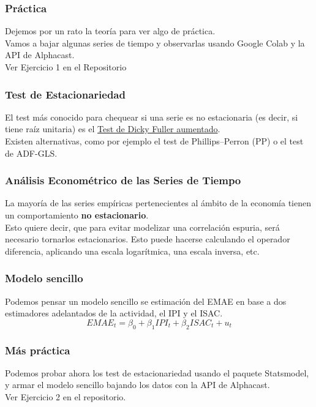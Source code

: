 \documentclass{beamer}
\begin{document}
\begin{frame}
\frametitle{Práctica}
\justify
Dejemos por un rato la teoría para ver algo de práctica. \\
\vspace{5mm} %
Vamos a bajar algunas series de tiempo y observarlas usando Google Colab y la API de Alphacast. \\
\vspace{5mm} %
Ver Ejercicio 1 en el Repositorio
\end{frame}


\begin{frame}
\frametitle{Test de Estacionariedad}
\justify
El test más conocido para chequear si una serie es no estacionaria (es decir, si tiene raíz unitaria) es el \href{https://en.wikipedia.org/wiki/Augmented_Dickey-Fuller_test}{Test de Dicky Fuller aumentado}.\\

\vspace{5mm} %
Existen alternativas, como por ejemplo el test de Phillips–Perron (PP) o el test de ADF-GLS. 
\end{frame}


\begin{frame}
\frametitle{Análisis Econométrico de las Series de Tiempo}
\justify
La mayoría de las series empíricas pertenecientes al ámbito de la economía tienen un comportamiento \textbf{no estacionario}.\\
\vspace{5mm} %
Esto quiere decir, que para evitar modelizar una correlación espuria, será necesario tornarlos estacionarios. Esto puede hacerse calculando el operador diferencia, aplicando una escala logarítmica, una escala inversa, etc. 
\end{frame}


\begin{frame}
\frametitle{Modelo sencillo}
\justify
Podemos pensar un modelo sencillo se estimación del EMAE en base a dos estimadores adelantados de la actividad, el IPI y el ISAC.\\
\vspace{5mm} %
\[
EMAE_t=\beta_0+\beta_1IPI_t+\beta_2ISAC_t+u_t
\]
\end{frame}

\begin{frame}

\frametitle{Más práctica}
Podemos probar ahora los test de estacionariedad usando el paquete Statsmodel, y armar el modelo sencillo bajando los datos con la API de Alphacast.\\ 

\vspace{5mm} %
Ver Ejercicio 2 en el repositorio.\\
\end{frame}
\end{document}
